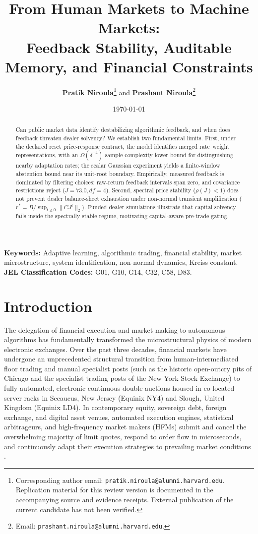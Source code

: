 \documentclass[12pt]{article}
\title{\textbf{From Human Markets to Machine Markets:}\\[0.3em]
\Large Feedback Stability, Auditable Memory, and Financial Constraints}
\author{\textbf{Pratik Niroula}\thanks{Corresponding author email: \texttt{pratik.niroula@alumni.harvard.edu}. Replication material for this review version is documented in the accompanying source and evidence receipts. External publication of the current candidate has not been verified.} \quad and \quad \textbf{Prashant Niroula}\thanks{Email: \texttt{prashant.niroula@alumni.harvard.edu}.}}
\date{\today}
\theoremstyle{definition}
\theoremstyle{remark}
\begin{document}
\maketitle
\thispagestyle{empty}

\vspace{-0.5em}
\begin{abstract}
\noindent Can public market data identify destabilizing algorithmic feedback, and when does feedback threaten dealer solvency? We establish two fundamental limits. First, under the declared reset price-response contract, the model identifies merged rate--weight representations, with an $\Omega(\delta^{-4})$ sample complexity lower bound for distinguishing nearby adaptation rates; the scalar Gaussian experiment yields a finite-window abstention bound near its unit-root boundary. Empirically, measured feedback is dominated by filtering choices: raw-return feedback intervals span zero, and covariance restrictions reject ($J=73.0, df=4$). Second, spectral price stability ($\rho(J)<1$) does not prevent dealer balance-sheet exhaustion under non-normal transient amplification ($r^* = B / \sup_{t \ge 0} \|C J^t\|_2$). Funded dealer simulations illustrate that capital solvency fails inside the spectrally stable regime, motivating capital-aware pre-trade gating.
\end{abstract}

\vspace{1.0em}
\noindent\textbf{Keywords:} Adaptive learning, algorithmic trading, financial stability, market microstructure, system identification, non-normal dynamics, Kreiss constant.\\
\textbf{JEL Classification Codes:} G01, G10, G14, C32, C58, D83.

\newpage
\setcounter{page}{1}

\section{Introduction}
\label{sec:intro}

The delegation of financial execution and market making to autonomous algorithms has fundamentally transformed the microstructural physics of modern electronic exchanges. Over the past three decades, financial markets have undergone an unprecedented structural transition from human-intermediated floor trading and manual specialist posts (such as the historic open-outcry pits of Chicago and the specialist trading posts of the New York Stock Exchange) to fully automated, electronic continuous double auctions housed in co-located server racks in Secaucus, New Jersey (Equinix NY4) and Slough, United Kingdom (Equinix LD4). In contemporary equity, sovereign debt, foreign exchange, and digital asset venues, automated execution engines, statistical arbitrageurs, and high-frequency market makers (HFMs) submit and cancel the overwhelming majority of limit quotes, respond to order flow in microseconds, and continuously adapt their execution strategies to prevailing market conditions \citep{hasbrouck1991,menkveld2013,budish2015,biais2015}.
\end{document}
